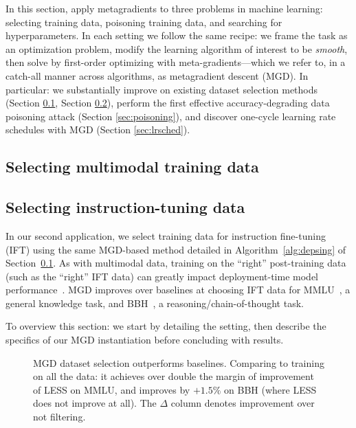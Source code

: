 In this section, apply metagradients to three problems in
machine learning: selecting training data, poisoning training data, and
searching for hyperparameters. In each setting we follow the same recipe:
we frame the task as an optimization problem, modify the learning algorithm
of interest to be \textit{smooth}, then solve by first-order
optimizing with meta-gradients---which we refer to, in a catch-all manner across
algorithms, as metagradient descent (MGD). In particular:
we substantially improve on existing dataset selection methods
(Section \ref{sec:datacomp},
Section \ref{sec:less}), perform the first effective
accuracy-degrading data poisoning attack
(Section \ref{sec:poisoning}), and discover one-cycle learning rate
schedules with MGD
(Section \ref{sec:lrsched}).

\subsection{Selecting multimodal training data}
\label{sec:datacomp}


\subsection{Selecting instruction-tuning data}
\label{sec:less}
In our second application, we select training data for instruction fine-tuning
(IFT) using the same MGD-based method detailed in Algorithm~\ref{alg:depsing} of
Section~\ref{sec:datacomp}. As with multimodal data, training on the ``right''
post-training data (such as the ``right'' IFT data) can greatly impact
deployment-time model
performance~\citep{liu2024deepseek,dubey2024llama,taori2023stanford}. MGD
improves over baselines at choosing IFT data for
MMLU~\citep{hendrycks2021measuring}, a general knowledge task, and
BBH~\citep{suzgun2022challenging}, a reasoning/chain-of-thought task.

To overview this section: we start by detailing the setting, then describe the
specifics of our MGD instantiation before concluding with results.

\begin{figure}[t]
  \centering
  \begin{subfigure}[t]{0.49\textwidth}
    \centering
    \raisebox{-0.605\height}{  }
  \end{subfigure}
  \hfill
  \begin{subfigure}[t]{0.5\textwidth}
    \centering

    
  \end{subfigure}
  \caption{MGD dataset selection outperforms baselines. Comparing to training
    on all the data: it achieves over double the margin of improvement of LESS
    on MMLU, and improves by $+1.5\%$ on BBH (where LESS does not improve at
  all). The $\Delta$ column denotes improvement over not filtering.}
  \label{fig:ift_dss}
\end{figure}

